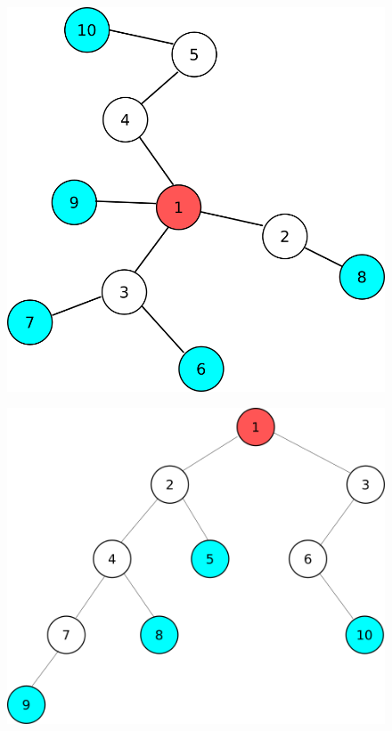 \documentclass{article}
\begin{document}
\begin{figure}[H]
    \centering
    \includegraphics[width=0.25\paperwidth]{expansivo}
\end{figure}

\begin{figure}[H]
    \centering
    \includegraphics[width=0.3\paperwidth]{arbolbinario}
\end{figure}
\end{document}
